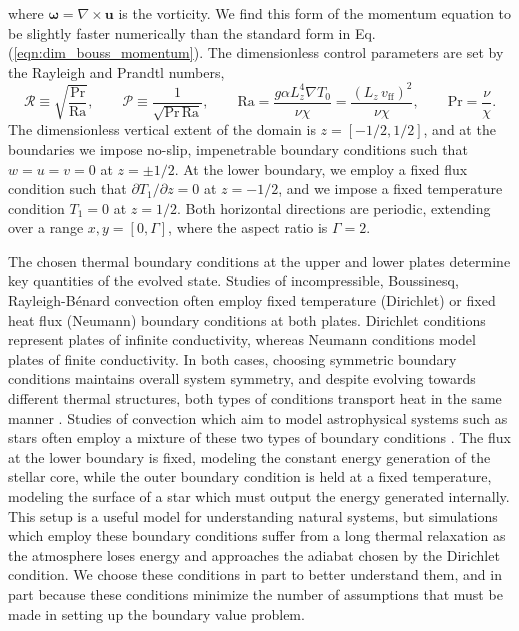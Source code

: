 \documentclass[aps, pre, onecolumn, nofootinbib, notitlepage, groupedaddress, amsfonts, amssymb, amsmath, longbibliography]{revtex4-1}
\newcommand{\grad}{\ensuremath{\nabla}}
\newcommand{\RB}{Rayleigh-B\'{e}nard }
\begin{document}
where $\bm{\omega} = \grad \times \bm{u}$ is the vorticity. We find this form of the momentum equation to
be slightly faster numerically than the standard form in Eq. (\ref{eqn:dim_bouss_momentum}).
The dimensionless control parameters are set by the Rayleigh and Prandtl numbers,
\begin{equation}
\mathcal{R} \equiv \sqrt{\frac{\text{Pr}}{\text{Ra}}}, \qquad \mathcal{P} \equiv \frac{1}{\sqrt{\text{Pr}\,\text{Ra}}}, \qquad
\text{Ra} = \frac{g \alpha L_z^4 \grad T_0}{\nu\chi} = \frac{(L_z\,v_{\text{ff}})^2}{\nu\chi}, \qquad \text{Pr} = \frac{\nu}{\chi}.
\end{equation}
The dimensionless vertical extent of the domain is $z = [-1/2, 1/2]$, and at the boundaries
we impose no-slip, impenetrable boundary conditions such that $w = u = v = 0$ at $z = \pm 1/2$.
At the lower boundary, we employ a fixed flux condition such that $\partial T_1 / \partial z = 0$
at $z = -1/2$, and we impose a fixed temperature condition $T_1 = 0$ at $z = 1/2$. Both
horizontal directions are periodic, extending over a range $x, y = [0, \Gamma]$, where
the aspect ratio is $\Gamma = 2$.

The chosen thermal boundary conditions at the upper and lower plates
determine key quantities of the evolved state.
Studies of incompressible, Boussinesq, \RB convection often
employ fixed temperature (Dirichlet) or fixed heat flux
(Neumann) boundary conditions at both plates.  
Dirichlet conditions represent plates of infinite conductivity,
whereas Neumann conditions model plates of finite conductivity.  
In both cases, choosing symmetric boundary conditions maintains overall system symmetry, 
and despite evolving towards different thermal structures, both types of conditions
transport heat in the same manner \cite{johnston&doering2009}.
Studies of convection which aim to model
astrophysical systems such as stars often employ a mixture of these
two types of boundary conditions \cite{hurlburt&all1984, cattaneo&all1991, korre&all2017}.  
The flux at the lower boundary is fixed, modeling
the constant energy generation of the stellar core, 
while the outer boundary condition is held at a fixed temperature,
modeling the surface of a star which must output the energy generated internally.
This setup is a useful model for understanding natural
systems, but simulations which employ these boundary conditions suffer from a long 
thermal relaxation as the atmosphere loses energy and approaches the adiabat chosen by the
Dirichlet condition.  We choose these conditions in part to better understand them, and in
part because these conditions minimize the number of assumptions that must be made in
setting up the boundary value problem.
\end{document}
